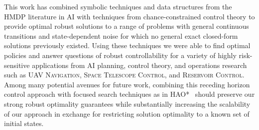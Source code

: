 %

This work has combined symbolic techniques and data structures from
the HMDP literature in AI with techniques from chance-constrained
control theory to provide optimal robust solutions to a range of
problems with general continuous transitions and state-dependent noise
for which no general exact closed-form solutions previously existed.
Using these techniques we were able to find optimal policies and
answer questions of robust controllability for a variety of highly
risk-sensitive applications from AI planning, control theory, and
operations research such as \textsc{UAV Navigation}, \textsc{Space
  Telescope Control}, and \textsc{Reservoir Control}.  Among many
potential avenues for future work, combining this receding horizon
control approach with focused search techniques as in HAO*~\cite{hao}
should preserve our strong robust optimality guarantees while
substantially increasing the scalability of our approach in exchange
for restricting solution optimality to a known set of initial states.
